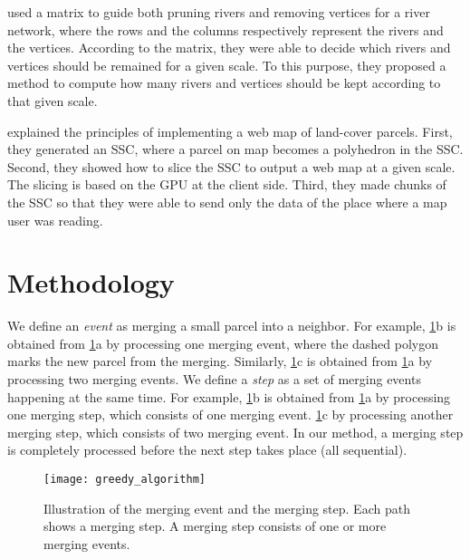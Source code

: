 \documentclass[ijgi,article,submit,moreauthors,pdftex]{Definitions/mdpi}
\begin{document}
\citet{Huang2017Matrix} used a matrix to guide 
both pruning rivers and removing vertices for a river network, 
where the rows and the columns respectively represent
the rivers and the vertices.
According to the matrix, 
they were able to decide which rivers and vertices 
should be remained for a given scale.
To this purpose, they proposed a method 
to compute how many rivers and vertices 
should be kept according to that given scale.



\citet{Meijers2020Web} explained the principles of 
implementing a web map of land-cover parcels.
First, they generated an SSC, 
where a parcel on map becomes a polyhedron in the SSC.
Second, they showed how to slice the SSC 
to output a web map at a given scale.
The slicing is based on the GPU at the client side.
Third, they made chunks of the SSC 
so that they were able to send only the data of the place
where a map user was reading.



%

\section{Methodology}
\label{sec:methodology}


We define an \emph{event} as merging a small parcel into a neighbor.
For example, \fig\ref{fig:event_and_step}b is obtained from 
\fig\ref{fig:event_and_step}a by processing one merging event,
where the dashed polygon marks the new parcel from the merging.
Similarly, \fig\ref{fig:event_and_step}c is obtained from 
\fig\ref{fig:event_and_step}a by processing two merging events.
We define a \emph{step} as 
a set of merging events happening at the same time.
For example, \fig\ref{fig:event_and_step}b is obtained from 
\fig\ref{fig:event_and_step}a by processing one merging step,
which consists of one merging event.
\fig\ref{fig:event_and_step}c by processing another merging step,
which consists of two merging event.
In our method, a merging step is completely processed 
before the next step takes place (all sequential). 

\begin{figure}[tb]
\centering
\texttt{[image: greedy\_algorithm]}
\caption{Illustration of the merging event and the merging step. 
Each path shows a merging step. 
A merging step consists of one or more merging events.}
\label{fig:event_and_step}
\end{figure}
\end{document}
